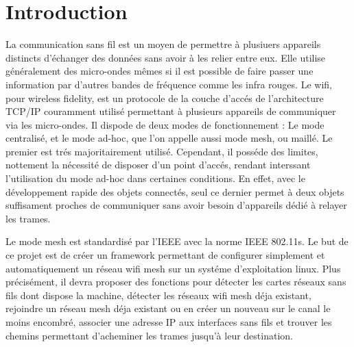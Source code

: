 \chapter*{Introduction}

La communication sans fil est un moyen de permettre à plusiuers appareils distincts d'échanger des données sans avoir à les relier
entre eux. Elle utilise généralement des micro-ondes mêmes si il est possible de faire passer une information par d'autres bandes de
fréquence comme les infra rouges. Le wifi, pour wireless fidelity, est un protocole de la couche d'accés de l'architecture TCP/IP
couramment utilisé permettant à plusieurs appareils de communiquer via les micro-ondes. Il dispode de deux modes de fonctionnement : 
Le mode centralisé, et le mode ad-hoc, que l'on appelle aussi mode mesh, ou maillé. Le premier est trés majoritairement utilisé. 
Cependant, il posséde des limites, nottement la nécessité de disposer d'un point d'accés, rendant interssant l'utilisation du mode
ad-hoc dans certaines conditions. En effet, avec le développement rapide des objets connectés, seul ce dernier permet à deux objets
suffisament proches de communiquer sans avoir besoin d'appareils dédié à relayer les trames.

Le mode mesh est standardisé par l'IEEE avec la norme IEEE 802.11s. Le but de ce projet est de créer un framework permettant de
configurer simplement et automatiquement un réseau wifi mesh sur un systéme d'exploitation linux. Plus précisément, il devra proposer
des fonctions pour détecter les cartes réseaux sans fils dont dispose la machine, détecter les réseaux wifi mesh déja existant,
rejoindre un réseau mesh déja existant ou en créer un nouveau sur le canal le moins encombré, associer une adresse IP aux interfaces
sans fils et trouver les chemins permettant d'acheminer les trames jusqu'à leur destination.



